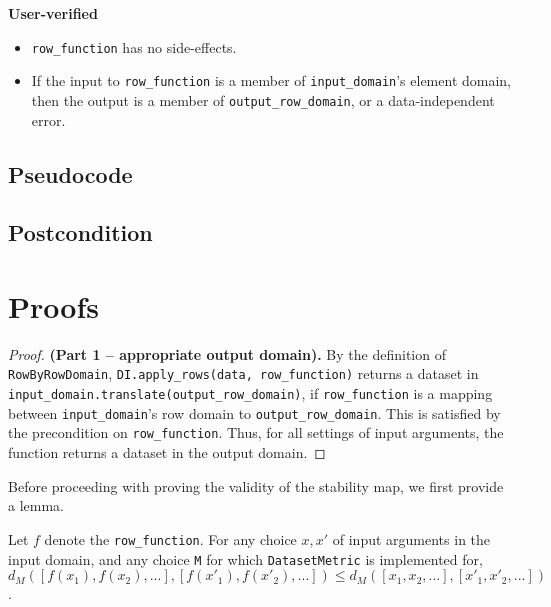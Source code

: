 \documentclass{article}
\begin{document}
\textbf{User-verified} 
\begin{itemize} 
    \item \texttt{row\_function} has no side-effects. 
    \item If the input to \texttt{row\_function} is a member of \texttt{input\_domain}'s element domain,  
    then the output is a member of \texttt{output\_row\_domain}, or a data-independent error. 
\end{itemize} 
 
\subsection*{Pseudocode} 
 
 
\subsection*{Postcondition} 
 
\section{Proofs} 
 
\begin{proof} \textbf{(Part 1 -- appropriate output domain).} 
    By the definition of \texttt{RowByRowDomain}, \texttt{DI.apply\_rows(data, row\_function)} returns a dataset in \texttt{input\_domain.translate(output\_row\_domain)}, 
    if \texttt{row\_function} is a mapping between \texttt{input\_domain}'s row domain to \texttt{output\_row\_domain}. 
    This is satisfied by the precondition on \texttt{row\_function}. 
    Thus, for all settings of input arguments, the function returns a dataset in the output domain. 
\end{proof} 
 
Before proceeding with proving the validity of the stability map, we first provide a lemma. 
 
\begin{lemma} 
    \label{f-sim} 
    Let $f$ denote the \texttt{row\_function}.  
    For any choice $x, x'$ of input arguments in the input domain, and any choice \texttt{M} for which \texttt{DatasetMetric} is implemented for, 
    $d_{M}([f(x_1), f(x_2), ...], [f(x'_1), f(x'_2), ...]) \le d_{M}([x_1, x_2, ...], [x'_1, x'_2, ...])$. 
\end{lemma} 
 
\end{document}
